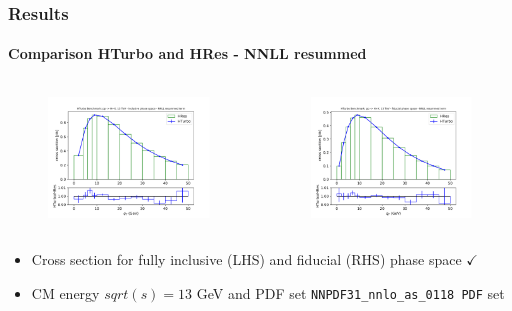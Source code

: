 \documentclass[aspectratio=43]{beamer}
\begin{document}
\begin{frame}
	
	\frametitle{Results}
	\framesubtitle{Comparison HTurbo and HRes - NNLL resummed}
	
	\footnotesize
	
	\begin{columns}
	
	
	\begin{figure}
		\includegraphics[width = 7cm]{plots/part3/chapter6/nnlo-res-1.png}
	\end{figure}
	
	
	\begin{figure}
		\includegraphics[width = 7cm]{plots/part3/chapter6/nnlo-res-fid-1.png}
	\end{figure}
	
	\end{columns}
	
	\begin{itemize}
	\item Cross section for fully inclusive (LHS) and fiducial (RHS) phase space {\color{darkgreen}$\checkmark$} 
	\item CM energy $sqrt(s) = 13$ GeV and PDF set \texttt{NNPDF31\_nnlo\_as\_0118 PDF} set
	\end{itemize}

\end{frame}
\end{document}
